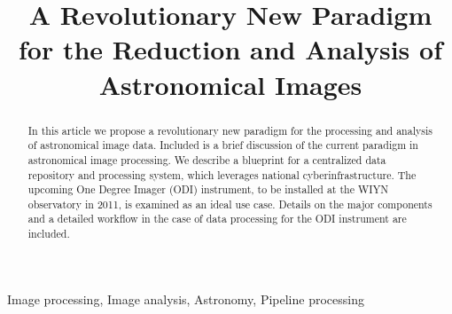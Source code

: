 \documentclass[10pt,conference]{IEEEtran}
\begin{document}
\title{A Revolutionary New Paradigm for the Reduction and Analysis of Astronomical Images}


\author{
}


\maketitle


\begin{abstract}
In this article we propose a revolutionary new paradigm for the processing and analysis of astronomical image data. Included is a brief discussion of the current paradigm in astronomical image processing. We describe a blueprint for a centralized data repository and processing system, which leverages national cyberinfrastructure. The upcoming One Degree Imager (ODI) instrument, to be installed at the WIYN observatory in 2011, is examined as an ideal use case. Details on the major components and a detailed workflow in the case of data processing for the ODI instrument are included. 
\end{abstract}

\begin{IEEEkeywords}
Image processing, Image analysis, Astronomy, Pipeline processing
\end{IEEEkeywords}
\end{document}
